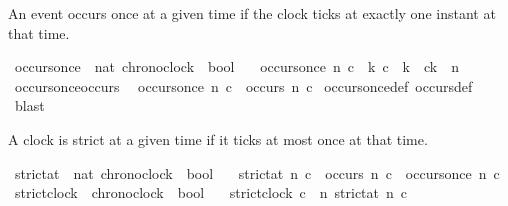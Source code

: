 \begin{isabellebody}
\begin{isamarkuptext}%
An event occurs once at a given time if the clock ticks at exactly one instant at that time.%
\end{isamarkuptext}\isamarkuptrue%
\isamarkupfalse%
\ occurs{\isacharunderscore}once\ {\isacharcolon}{\isacharcolon}\ {\isacartoucheopen}{\isacharbrackleft}nat{\isacharcomma}\ chronoclock{\isacharbrackright}\ {\isasymRightarrow}\ bool{\isacartoucheclose}\isanewline
\ \ \ {\isacartoucheopen}occurs{\isacharunderscore}once\ n\ c\ {\isasymequiv}\ {\isasymexists}{\isacharbang}k{\isachardot}\ {\isacharparenleft}c\ {\isasymnabla}\ k\ {\isasymand}\ c\isactrlbsub k\isactrlesub \ {\isacharequal}\ n{\isacharparenright}{\isacartoucheclose}\isanewline
\isanewline
{}\isamarkupfalse%
\ occurs{\isacharunderscore}once{\isacharunderscore}occurs{\isacharcolon}\isanewline
\ \ {\isacartoucheopen}occurs{\isacharunderscore}once\ n\ c\ {\isasymLongrightarrow}\ occurs\ n\ c{\isacartoucheclose}\isanewline
%
\isadelimproof
%
\endisadelimproof
%
\isatagproof
{}\isamarkupfalse%
\ occurs{\isacharunderscore}once{\isacharunderscore}def\ occurs{\isacharunderscore}def\ \isamarkupfalse%
\ blast%
\endisatagproof
{\isafoldproof}%
%
\isadelimproof
%
\endisadelimproof
%
\begin{isamarkuptext}%
A clock is strict at a given time if it ticks at most once at that time.%
\end{isamarkuptext}\isamarkuptrue%
\isamarkupfalse%
\ strict{\isacharunderscore}at\ {\isacharcolon}{\isacharcolon}\ {\isacartoucheopen}{\isacharbrackleft}nat{\isacharcomma}\ chronoclock{\isacharbrackright}\ {\isasymRightarrow}\ bool{\isacartoucheclose}\isanewline
\ \ \ {\isacartoucheopen}strict{\isacharunderscore}at\ n\ c\ {\isasymequiv}\ {\isacharparenleft}occurs\ n\ c\ {\isasymlongrightarrow}\ occurs{\isacharunderscore}once\ n\ c{\isacharparenright}{\isacartoucheclose}\isanewline
\isanewline
{}\isamarkupfalse%
\ strict{\isacharunderscore}clock\ {\isacharcolon}{\isacharcolon}\ {\isacartoucheopen}chronoclock\ {\isasymRightarrow}\ bool{\isacartoucheclose}\isanewline
\ \ \ {\isacartoucheopen}strict{\isacharunderscore}clock\ c\ {\isasymequiv}\ {\isacharparenleft}{\isasymforall}n{\isachardot}\ strict{\isacharunderscore}at\ n\ c{\isacharparenright}{\isacartoucheclose}%
\isadelimdocument
%
\endisadelimdocument
%
\isatagdocument
%
\isamarkuptrue%

\end{isabellebody}
